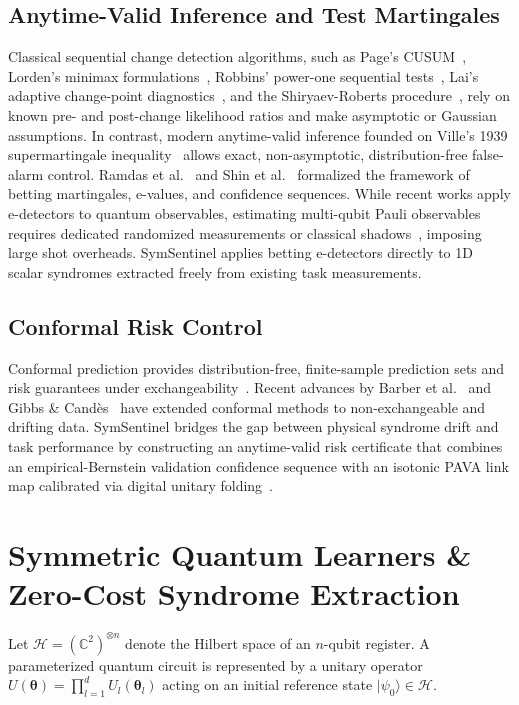\documentclass[aps,pra,twocolumn,superscriptaddress,10pt,floatfix]{revtex4-2}
\begin{document}
\subsection{Anytime-Valid Inference and Test Martingales}
Classical sequential change detection algorithms, such as Page's CUSUM~\cite{page1954continuous}, Lorden's minimax formulations~\cite{lorden1970procedures}, Robbins' power-one sequential tests~\cite{robbins1970statistical}, Lai's adaptive change-point diagnostics~\cite{lai1995sequential}, and the Shiryaev-Roberts procedure~\cite{shiryaev1963optimum}, rely on known pre- and post-change likelihood ratios and make asymptotic or Gaussian assumptions. In contrast, modern anytime-valid inference founded on Ville's 1939 supermartingale inequality~\cite{ville1939etude} allows exact, non-asymptotic, distribution-free false-alarm control. Ramdas et al.~\cite{ramdas2020admissible,howard2021time,waudby2024estimating,ramdas2023game} and Shin et al.~\cite{shin2022nonparametric} formalized the framework of betting martingales, e-values, and confidence sequences. While recent works apply e-detectors to quantum observables, estimating multi-qubit Pauli observables requires dedicated randomized measurements or classical shadows~\cite{huang2020predicting}, imposing large shot overheads. SymSentinel applies betting e-detectors directly to 1D scalar syndromes extracted freely from existing task measurements.

\subsection{Conformal Risk Control}
Conformal prediction provides distribution-free, finite-sample prediction sets and risk guarantees under exchangeability~\cite{angelopoulos2023conformal,vovk2005algorithmic,angelopoulos2021gentle,romano2020classification}. Recent advances by Barber et al.~\cite{barber2023conformal} and Gibbs \& Cand\`es~\cite{gibbs2021adaptive} have extended conformal methods to non-exchangeable and drifting data. SymSentinel bridges the gap between physical syndrome drift and task performance by constructing an anytime-valid risk certificate that combines an empirical-Bernstein validation confidence sequence with an isotonic PAVA link map calibrated via digital unitary folding~\cite{giurgicatiron2020digital,temme2017error,endo2018practical}.

\section{Symmetric Quantum Learners \& Zero-Cost Syndrome Extraction}
\label{sec:symmetry}
Let $\mathcal{H} = (\mathbb{C}^2)^{\otimes n}$ denote the Hilbert space of an $n$-qubit register. A parameterized quantum circuit is represented by a unitary operator $U(\boldsymbol{\theta}) = \prod_{l=1}^d U_l(\boldsymbol{\theta}_l)$ acting on an initial reference state $|\psi_0\rangle \in \mathcal{H}$. 
\end{document}
